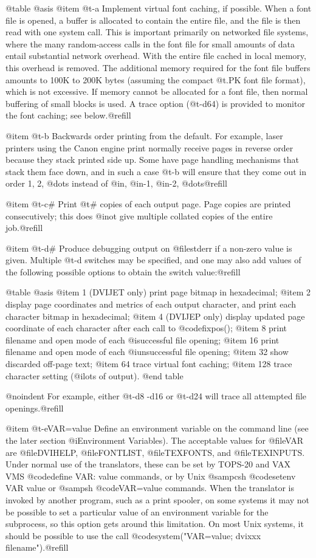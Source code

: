@table @asis
@item @t{-a}
Implement virtual font caching, if possible.  When a font
file is opened, a buffer is allocated to contain the entire
file, and the file is then read with one system call.  This
is important primarily on networked file systems, where the
many random-access calls in the font file for small amounts
of data entail substantial network overhead.  With the entire
file cached in local memory, this overhead is removed.  The
additional memory required for the font file buffers amounts
to 100K to 200K bytes (assuming the compact @t{.PK} font
file format), which is not excessive.  If memory cannot be
allocated for a font file, then normal buffering of small
blocks is used.  A trace option (@t{-d64}) is provided to
monitor the font caching; see below.@refill

@item @t{-b}
Backwards order printing from the default.  For example,
laser printers using the Canon engine print normally receive
pages in reverse order because they stack printed side up.
Some have page handling mechanisms that stack them face down,
and in such a case @t{-b} will ensure that they come out in
order 1, 2, @dots{} instead of @i{n}, @i{n-1}, @i{n-2},
@dots{}@refill

@item @t{-c#}
Print @t{#} copies of each output page.  Page copies are
printed consecutively; this does @i{not} give multiple
collated copies of the entire job.@refill

@item @t{-d#}
Produce debugging output on @file{stderr} if a non-zero
value is given.  Multiple @t{-d} switches may be
specified, and one may also add values of the following
possible options to obtain the switch value:@refill

@table @asis
@item 1
(DVIJET only) print page bitmap in hexadecimal;
@item 2
display page coordinates and metrics of each output
character, and print each character bitmap in
hexadecimal;
@item 4
(DVIJEP only) display updated page coordinate of each
character after each call to @code{fixpos()};
@item 8
print filename and open mode of each @i{successful} file
opening;
@item 16
print filename and open mode of each @i{unsuccessful}
file opening;
@item 32
show discarded off-page text;
@item 64
trace virtual font caching;
@item 128
trace character setting (@i{lots} of output).
@end table

@noindent
For example, either @t{-d8 -d16} or @t{-d24} will trace all
attempted file openings.@refill

@item @t{-eVAR=value}
Define an environment variable on the command line (see the
later section @i{Environment Variables}).  The acceptable
values for @file{VAR} are @file{DVIHELP}, @file{FONTLIST},
@file{TEXFONTS}, and @file{TEXINPUTS}.  Under normal use of
the translators, these can be set by TOPS-20 and VAX
VMS @code{define VAR: value} commands, or by Unix
@samp{csh} @code{setenv VAR value} or @samp{sh}
@code{VAR=value} commands.  When the translator is invoked by
another program, such as a print spooler, on some systems it
may not be possible to set a particular value of an
environment variable for the subprocess, so this option gets
around this limitation.  On most Unix systems, it should be
possible to use the call @code{system("VAR=value; dvixxx
filename")}.@refill

